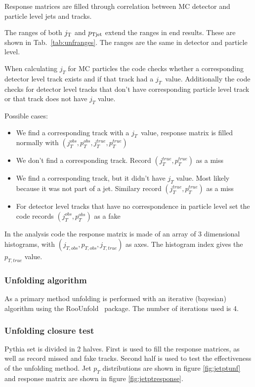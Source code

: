 Response matrices are filled through correlation between MC detector and particle level jets and tracks.

The ranges of both $j_{\rm T}$ and $p_{\rm Tjet}$ extend the ranges in end results. These are shown in Tab.~\ref{tab:unfranges}. The ranges are the same in detector and particle level.

When calculating $j_T$ for MC particles the code checks whether a corresponding detector level track exists and if that track had a $j_T$ value. Additionally the code checks for detector level tracks that don't have corresponding particle level track or that track does not have $j_T$ value.

Possible cases:
\begin{itemize}
\item We find a corresponding track with a $j_T$ value, response matrix is filled normally with $\left(j^{obs}_{T},p_T^{obs},j^{true}_{T},p_T^{true}\right)$
\item We don't find a corresponding track. Record $\left(j^{true}_{T},p_T^{true}\right)$ as a miss 
\item We find a corresponding track, but it didn't have $j_T$ value. Most likely because it was not part of a jet. Similary record $\left(j^{true}_{T},p_T^{true}\right)$ as a miss
\item For detector level tracks that have no correspondence in particle level set the code records  $\left(j^{obs}_{T},p_T^{obs}\right)$ as a fake
\end{itemize}

In the analysis code the response matrix is made of an array of 3 dimensional histograms, with $\left(j_{T,obs},p_{T,obs},j_{T,true}\right)$ as axes. The histogram index gives the $p_{T,true}$ value.

\subsubsection{Unfolding algorithm}
As a primary method unfolding is performed with an iterative (bayesian) algorithm using the RooUnfold~\cite{roounfold} package. The number of iterations used is 4. 


\subsubsection{Unfolding  closure test}
Pythia set is divided in 2 halves. First is used to fill the response matrices, as well as record missed and fake tracks. Second half is used to test the effectiveness of the unfolding method. Jet $p_T$ distributions are shown in figure \ref{fig:jetptunf} and response matrix are shown in figure \ref{fig:jetptresponse}.
 
